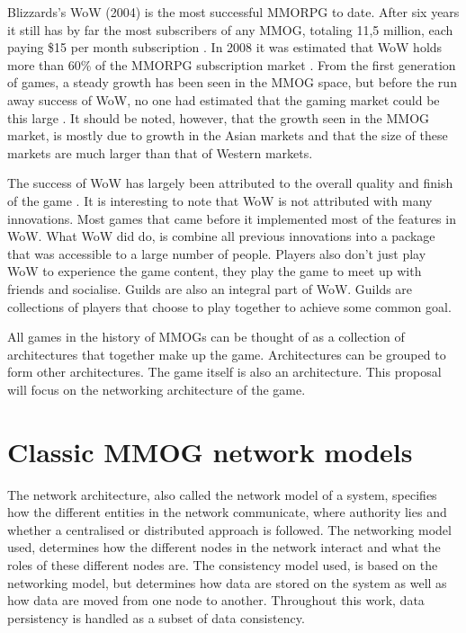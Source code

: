 \documentclass[journal,oneside,a4paper,onecolumn]{IEEEtran}
\begin{document}
Blizzards's \ac{WoW} (2004) is the most successful MMORPG to date. After six years it still has by far the most subscribers of any MMOG, totaling 11,5 million, each paying \$15 per month subscription \cite{wow_subscibers}. In 2008 it was estimated that WoW holds more than 60\% of the MMORPG subscription market \cite{mmog_sub_market}. From the first generation of games, a steady growth has been seen in the MMOG space, but before the run away success of WoW, no one had estimated that the gaming market could be this large \cite{mmog_growth_analysis}. It should be noted, however, that the growth seen in the \ac{MMOG} market, is mostly due to growth in the Asian markets and that the size of these markets are much larger than that of Western markets.

The success of \ac{WoW} has largely been attributed to the overall quality and finish of the game \cite{wow_gameplay}. It is interesting to note that WoW is not attributed with many innovations. Most games that came before it implemented most of the features in WoW. What WoW did do, is combine all previous innovations into a package that was accessible to a large number of people.  Players also don't just play WoW to experience the game content, they play the game to meet up with friends and socialise. Guilds are also an integral part of WoW. Guilds are collections of players that choose to play together to achieve some common goal.

All games in the history of \acp{MMOG} can be thought of as a collection of architectures that together make up the game. Architectures can be grouped to form other architectures. The game itself is also an architecture. This proposal will focus on the networking architecture of the game.


\section{Classic MMOG network models}
\label{classic_network_models}

The network architecture, also called the network model of a system, specifies how the different entities in the network communicate, where authority lies and whether a centralised or distributed approach is followed. The networking model used, determines how the different nodes in the network interact and what the roles of these different nodes are. The consistency model used, is based on the networking model, but determines how data are stored on the system as well as how data are moved from one node to another. Throughout this work, data persistency is handled as a subset of data consistency.
\end{document}
